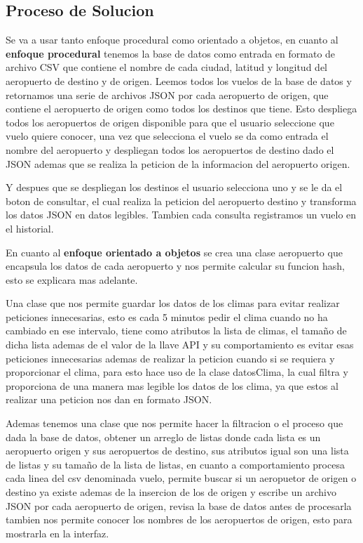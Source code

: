 \documentclass[12pt]{article}
\begin{document}
\subsection{Proceso de Solucion}
Se va a usar tanto enfoque procedural como orientado a objetos, en cuanto al \textbf{enfoque procedural} tenemos la base de datos como entrada en formato de archivo CSV que contiene el nombre de cada ciudad, latitud y longitud del aeropuerto de destino y de origen. Leemos todos los vuelos de la base de datos y retornamos una serie de archivos JSON por cada aeropuerto de origen, que contiene el aeropuerto de origen como todos los destinos que tiene. Esto despliega todos los aeropuertos de origen disponible para que el usuario seleccione que vuelo quiere conocer, una vez que selecciona el vuelo se da como entrada el nombre del aeropuerto y despliegan todos los aeropuertos de destino dado el JSON ademas que se realiza la peticion de la informacion del aeropuerto origen.

Y despues que se despliegan los destinos el usuario selecciona uno y se le da el boton de consultar, el cual realiza la peticion del aeropuerto destino y transforma los datos JSON en datos legibles. Tambien cada consulta registramos un vuelo en el historial.

En cuanto al \textbf{enfoque orientado a objetos} se crea una clase aeropuerto que encapsula los datos de cada aeropuerto y nos permite calcular su funcion hash, esto se explicara mas adelante.

Una clase que nos permite guardar los datos de los climas para evitar realizar peticiones innecesarias, esto es cada 5 minutos pedir el clima cuando no ha cambiado en ese intervalo, tiene como atributos la lista de climas, el tamaño de dicha lista ademas de el valor de la llave API y su comportamiento es evitar esas peticiones innecesarias ademas de realizar la peticion cuando si se requiera y proporcionar el clima, para esto hace uso de la clase datosClima, la cual filtra y proporciona de una manera mas legible los datos de los clima, ya que estos al realizar una peticion nos dan en formato JSON.

Ademas tenemos una clase que nos permite hacer la filtracion o el proceso que dada la base de datos, obtener un arreglo de listas donde cada lista es un aeropuerto origen y sus aeropuertos de destino, sus atributos igual son una lista de listas y su tamaño de la lista de listas, en cuanto a comportamiento procesa cada linea del csv denominada vuelo, permite buscar si un aeropuetor de origen o destino ya existe ademas de la insercion de los de origen y escribe un archivo JSON por cada aeropuerto de origen, revisa la base de datos antes de procesarla tambien nos permite conocer los nombres de los aeropuertos de origen, esto para mostrarla en la interfaz.
\end{document}

